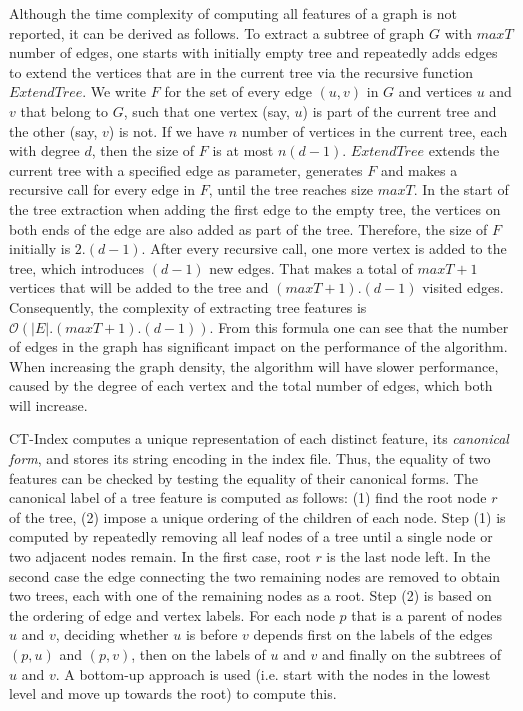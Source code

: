 \documentclass{l4proj}
\begin{document}
%
%
Although the time complexity of computing all features of a graph is not reported, it can be derived as follows. To extract a subtree of graph $G$ with $maxT$ number of edges, one starts with initially empty tree and repeatedly adds edges to extend the vertices that are in the current tree via the recursive function $ExtendTree$. We write $F$ for the set of every edge $(u,v)$ in $G$ and vertices $u$ and $v$ that belong to $G$, such that one vertex (say, $u$) is part of the current tree and the other (say, $v$) is not. If we have $n$ number of vertices in the current tree, each with degree $d$, then the size of $F$ is at most $n(d-1)$. $ExtendTree$ extends the current tree with a specified edge as parameter, generates $F$ and makes a recursive call for every edge in $F$, until the tree reaches size $maxT$.
In the start of the tree extraction when adding the first edge to the empty tree, the vertices on both ends of the edge are also added as part of the tree. Therefore, the size of $F$ initially is $2.(d-1)$. After every recursive call, one more vertex is added to the tree, which introduces $(d-1)$ new edges. That makes a total of $maxT+1$ vertices that will be added to the tree and $(maxT+1).(d-1)$ visited edges. Consequently, the complexity of extracting tree features is $\mathcal{O}(|E|.(maxT+1).(d-1))$. From this formula one can see that the number of edges in the graph has significant impact on the performance of the algorithm. When increasing the graph density, the algorithm will have slower performance, caused by the degree of each vertex and the total number of edges, which both will increase.

CT-Index computes a unique representation of each distinct feature, its \emph{canonical form}, and stores its string encoding in the index file. Thus, the equality of two features can be checked by testing the equality of their canonical forms. The canonical label of a tree feature is computed as follows: (1) find the root node $r$ of the tree, (2) impose a unique ordering of the children of each node. Step (1) is computed by repeatedly removing all leaf nodes of a tree until a single node or two adjacent nodes remain. In the first case, root $r$ is the last node left. In the second case the edge connecting the two remaining nodes are removed to obtain two trees, each with one of the remaining nodes as a root. 
Step (2) is based on the ordering of edge and vertex labels. For each node $p$ that is a parent of nodes $u$ and $v$, deciding whether $u$ is before $v$ depends first on the labels of the edges $(p,u)$ and $(p,v)$, then on the labels of $u$ and $v$ and finally on the subtrees of $u$ and $v$. A bottom-up approach is used (i.e. start with the nodes in the lowest level and move up towards the root) to compute this.
\end{document}
